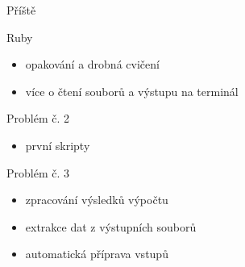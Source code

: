 \documentclass{beamer}
\begin{document}
\begin{frame}{Příště}
  \begin{block}{Ruby}
    \begin{itemize}
      \item opakování a drobná cvičení
      \item více o čtení souborů a výstupu na terminál
    \end{itemize}
  \end{block}
  \begin{block}{Problém č. 2}
    \begin{itemize}
      \item první skripty
    \end{itemize}
  \end{block}
  \begin{block}{Problém č. 3}
    \begin{itemize}
      \item zpracování výsledků výpočtu
      \item extrakce dat z výstupních souborů
      \item automatická příprava vstupů
    \end{itemize}
  \end{block}
\end{frame}
\end{document}
